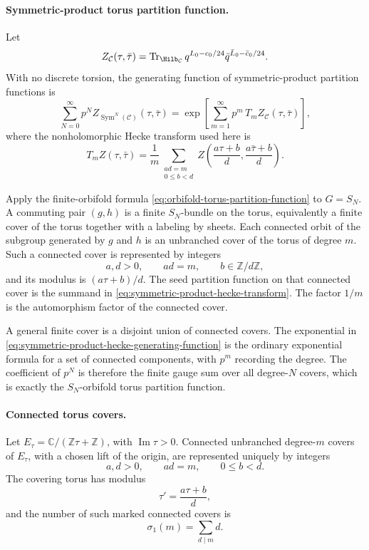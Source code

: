 \paragraph{Symmetric-product torus partition function.}
Let
\[
  Z_{\mathcal C}(\tau,\bar\tau)
  =
  \operatorname{Tr}_{\Hilb_{\mathcal C}}
  q^{L_0-c_0/24}\bar q^{\bar L_0-\bar c_0/24}.
\]
With no discrete torsion, the generating function of symmetric-product
partition functions is
\begin{equation}
  \sum_{N=0}^\infty p^N
  Z_{\operatorname{Sym}^N(\mathcal C)}(\tau,\bar\tau)
  =
  \exp\left[
    \sum_{m=1}^\infty p^m\,T_m Z_{\mathcal C}(\tau,\bar\tau)
  \right],
  \label{eq:symmetric-product-hecke-generating-function}
\end{equation}
where the nonholomorphic Hecke transform used here is
\begin{equation}
  T_m Z(\tau,\bar\tau)
  =
  \frac1m
  \sum_{\substack{ad=m\\0\le b<d}}
  Z\!\left(\frac{a\tau+b}{d},
           \frac{a\bar\tau+b}{d}\right).
  \label{eq:symmetric-product-hecke-transform}
\end{equation}

Apply the finite-orbifold formula
\eqref{eq:orbifold-torus-partition-function} to \(G=S_N\).  A commuting pair
\((g,h)\) is a finite \(S_N\)-bundle on the torus, equivalently a finite
cover of the torus together with a labeling by sheets.  Each connected orbit
of the subgroup generated by \(g\) and \(h\) is an unbranched cover of the
torus of degree \(m\).  Such a connected cover is represented by integers
\[
  a,d>0,\qquad ad=m,\qquad b\in\mathbb Z/d\mathbb Z,
\]
and its modulus is \((a\tau+b)/d\).  The seed partition function on that
connected cover is the summand in \eqref{eq:symmetric-product-hecke-transform}.
The factor \(1/m\) is the automorphism factor of the connected cover.

A general finite cover is a disjoint union of connected covers.  The
exponential in \eqref{eq:symmetric-product-hecke-generating-function} is the
ordinary exponential formula for a set of connected components, with \(p^m\)
recording the degree.  The coefficient of \(p^N\) is therefore the finite
gauge sum over all degree-\(N\) covers, which is exactly the
\(S_N\)-orbifold torus partition function.

\paragraph{Connected torus covers.}
Let \(E_\tau=\mathbb C/(\mathbb Z\tau+\mathbb Z)\), with
\(\operatorname{Im}\tau>0\).  Connected unbranched degree-\(m\) covers of
\(E_\tau\), with a chosen lift of the origin, are represented uniquely by
integers
\[
  a,d>0,\qquad ad=m,\qquad 0\le b<d .
\]
The covering torus has modulus
\begin{equation}
  \tau'=\frac{a\tau+b}{d},
  \label{eq:symmetric-product-connected-cover-modulus}
\end{equation}
and the number of such marked connected covers is
\begin{equation}
  \sigma_1(m)=\sum_{d\mid m}d .
  \label{eq:symmetric-product-connected-cover-count}
\end{equation}


